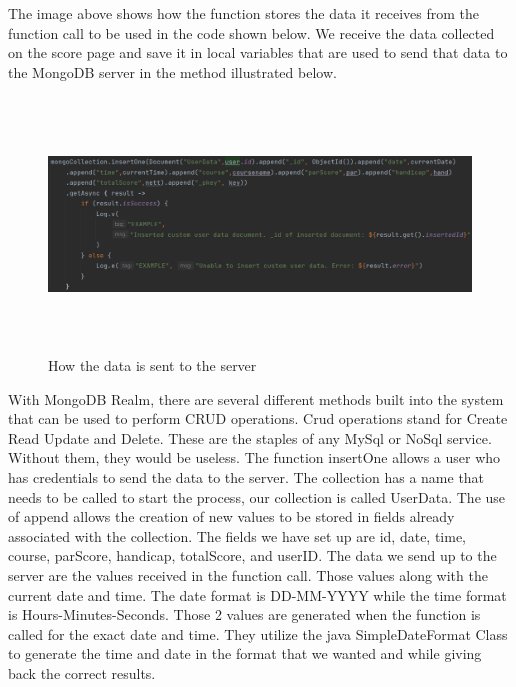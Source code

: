 The image above shows how the function stores the data it receives from the function call to be used in the code shown below. We receive the data collected on the score page and save it in local variables that are used to send that data to the MongoDB server in the method illustrated below.
\begin{figure}[H]
    \centering
    \includegraphics[width=15cm, height = 6.75cm]{img/sendServer.PNG}
    \caption{How the data is sent to the server}
    \label{fig:altas config}
\end{figure}
With MongoDB Realm, there are several different methods built into the system that can be used to perform CRUD operations. Crud operations stand for Create Read Update and Delete. These are the staples of any MySql or NoSql service. Without them, they would be useless. The function insertOne allows a user who has credentials to send the data to the server.
\newline
The collection has a name that needs to be called to start the process, our collection is called UserData. The use of append allows the creation of new values to be stored in fields already associated with the collection. The fields we have set up are id, date, time, course, parScore, handicap, totalScore, and userID. The data we send up to the server are the values received in the function call. Those values along with the current date and time. The date format is DD-MM-YYYY while the time format is Hours-Minutes-Seconds. Those 2 values are generated when the function is called for the exact date and time. They utilize the java SimpleDateFormat Class to generate the time and date in the format that we wanted and while giving back the correct results.
